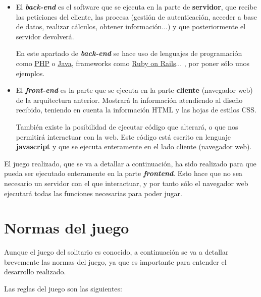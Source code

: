 \documentclass{\ClassPath/viu-tfm-template}
\begin{document}
\begin{itemize}
    \item El \textbf{\textit{back-end}} es el software que se ejecuta en la parte de \textbf{servidor}, que recibe las peticiones del cliente, las procesa (gestión de autenticación, acceder a base de datos, realizar cálculos, obtener información...) y que posteriormente el servidor devolverá.

    En este apartado de \textbf{\textit{back-end}} se hace uso de lenguajes de programación como \href{https://www.php.net/}{PHP} o \href{https://www.java.com/es/}{Java}, frameworks como \href{https://rubyonrails.org/}{Ruby on Rails}... , por poner sólo unos ejemplos.

    \item El \textbf{\textit{front-end}} es la parte que se ejecuta en la parte \textbf{cliente} (navegador web) de la arquitectura anterior. Mostrará la información atendiendo al diseño recibido, teniendo en cuenta la información HTML y las hojas de estilos CSS.

    También existe la posibilidad de ejecutar código que alterará, o que nos permitirá interactuar con la web. Este código está escrito en lenguaje \textbf{javascript} y que se ejecuta enteramente en el lado cliente (navegador web).
\end{itemize}

El juego realizado, que se va a detallar a continuación, ha sido realizado para que pueda ser ejecutado enteramente en la parte \textbf{\textit{frontend}}. Esto hace que no sea necesario un servidor con el que interactuar, y por tanto sólo el navegador web ejecutará todas las funciones necesarias para poder jugar.


\chapter{Normas del juego}

Aunque el juego del solitario es conocido, a continuación se va a detallar brevemente las normas del juego, ya que es importante para entender el desarrollo realizado.

Las reglas del juego son las siguientes:
\end{document}
